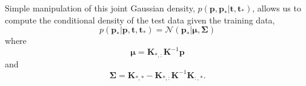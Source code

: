 \documentclass{article}
\begin{document}
Simple  manipulation of  this joint  Gaussian  density, $p(\mathbf{p},
\mathbf{p_*}|\mathbf{t},  \mathbf{t}_*)$,  allows  us to  compute  the
conditional density of the test data given the training data,
\begin{equation}
  p(\mathbf{p}_* | \mathbf{p}, \mathbf{t}, \mathbf{t}_*) = \mathcal{N}\left(\mathbf{p}_*|\boldsymbol{\mu}, \boldsymbol{\Sigma}\right)
\end{equation}
where
\begin{equation}
  \boldsymbol{\mu} = \mathbf{K}_{*,:}\mathbf{K}^{-1}\mathbf{p}
\end{equation}
and 
\begin{equation}
  \boldsymbol{\Sigma} = \mathbf{K}_{*,*} - \mathbf{K}_{*,:}\mathbf{K}^{-1}\mathbf{K}_{:,*}.
\end{equation}
\end{document}

